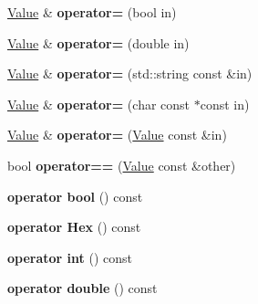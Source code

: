 \begin{DoxyCompactItemize}
\item 
\hypertarget{classValue_a1b8503ac06f2d38d4397563d8938c38d}{\hyperlink{classValue}{Value} \& {\bfseries operator=} (bool in)}\label{classValue_a1b8503ac06f2d38d4397563d8938c38d}

\item 
\hypertarget{classValue_a80b1b8f5ffdb388b1bb05503496001fe}{\hyperlink{classValue}{Value} \& {\bfseries operator=} (double in)}\label{classValue_a80b1b8f5ffdb388b1bb05503496001fe}

\item 
\hypertarget{classValue_aa02130c8e6757fd4bce9935d625734d6}{\hyperlink{classValue}{Value} \& {\bfseries operator=} (std\-::string const \&in)}\label{classValue_aa02130c8e6757fd4bce9935d625734d6}

\item 
\hypertarget{classValue_a4a5b2bc2b05611099604be886c4a7ab2}{\hyperlink{classValue}{Value} \& {\bfseries operator=} (char const $\ast$const in)}\label{classValue_a4a5b2bc2b05611099604be886c4a7ab2}

\item 
\hypertarget{classValue_af798e816bde30926938ff0b4d419f473}{\hyperlink{classValue}{Value} \& {\bfseries operator=} (\hyperlink{classValue}{Value} const \&in)}\label{classValue_af798e816bde30926938ff0b4d419f473}

\item 
\hypertarget{classValue_a83dd7dced02d472f52c180483af4e786}{bool {\bfseries operator==} (\hyperlink{classValue}{Value} const \&other)}\label{classValue_a83dd7dced02d472f52c180483af4e786}

\item 
\hypertarget{classValue_a4a45513291b4b3b43af850e6eb7c6cfc}{{\bfseries operator bool} () const }\label{classValue_a4a45513291b4b3b43af850e6eb7c6cfc}

\item 
\hypertarget{classValue_ab24957cb5a186101cc31b11726c225e2}{{\bfseries operator Hex} () const }\label{classValue_ab24957cb5a186101cc31b11726c225e2}

\item 
\hypertarget{classValue_a5ae69fac4832ec792d82f95643ca3c2f}{{\bfseries operator int} () const }\label{classValue_a5ae69fac4832ec792d82f95643ca3c2f}

\item 
\hypertarget{classValue_af47eaea9ca690c4d84047361446b4b33}{{\bfseries operator double} () const }\label{classValue_af47eaea9ca690c4d84047361446b4b33}


\end{DoxyCompactItemize}
